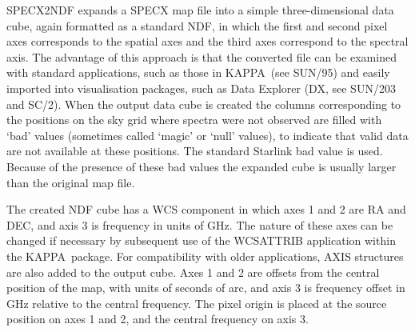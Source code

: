 \documentclass[twoside,11pt]{article}
\newcommand{\xref}[3]{#1}
\newcommand{\KAPPA}{{\footnotesize KAPPA}}
\begin{document}
{{      SPECX2NDF expands a SPECX map file into a simple three-dimensional
      data cube, again formatted as a standard NDF, in which the first
      and second pixel axes corresponds to the spatial axes and the third
      axes correspond to the spectral axis.  The advantage of
      this approach is that the converted file can be examined with
      standard applications, such as those in \KAPPA\ (see \xref{SUN/95}{sun95}{}) and
      easily imported into visualisation packages, such as Data Explorer
      (DX, see \xref{SUN/203}{sun203}{} and \xref{SC/2}{sc2}{}).  When the 
      output data cube is created
      the columns corresponding to the positions on the sky grid where
      spectra were not observed are filled with \xref{`bad'
      values}{sun95}{se_masking} (sometimes
      called `magic' or `null' values), to indicate that valid data are
      not available at these positions.  The \xref{standard Starlink
      bad value}{sun95}{se_badmasking}
      is used.  Because of the presence of these bad values the expanded
      cube is usually larger than the original map file.

      The created NDF cube has a WCS component in which axes 1 and 2 are
      RA and DEC, and axis 3 is frequency in units of GHz. The nature of
      these axes can be changed if necessary by subsequent use of the
      \xref{WCSATTRIB}{sun95}{WCSATTRIB} application within the \KAPPA\ package.
      For compatibility
      with older applications, AXIS structures are also added to the output
      cube. Axes 1 and 2 are offsets from the central position of the map,
      with units of seconds of arc, and axis 3 is frequency offset in GHz
      relative to the central frequency.  The pixel origin is placed at the
      source position on axes 1 and 2, and the central frequency on axis 3.

}}
\end{document}
